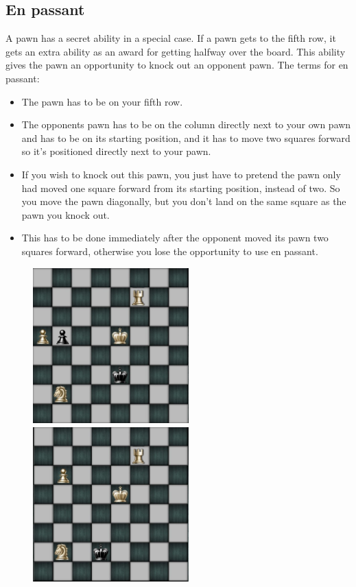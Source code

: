 \documentclass{article}
\begin{document}
\subsection*{En passant} A pawn has a secret ability in a special case. If a pawn gets to the fifth row, it gets an extra ability as an award for getting halfway over the board. This ability gives the pawn an opportunity to knock out an opponent pawn. The terms for en passant:
\begin{itemize}
	\item The pawn has to be on your fifth row. 
	\item The opponents pawn has to be on the column directly next to your own pawn and has to be on its starting position, and it has to move two squares forward so it’s positioned directly next to your pawn. 
	\item If you wish to knock out this pawn, you just have to pretend the pawn only had moved one square forward from its starting position, instead of two. So you move the pawn diagonally, but you don’t land on the same square as the pawn you knock out. 
	\item This has to be done immediately after the opponent moved its pawn two squares forward, otherwise you lose the opportunity to use en passant.
\end{itemize}
\begin{figure}[h]
\includegraphics[width=6cm, height=6cm]{enpa1} \includegraphics[width=6cm, height=6cm]{enpa2} 
\end{figure}
\end{document}
